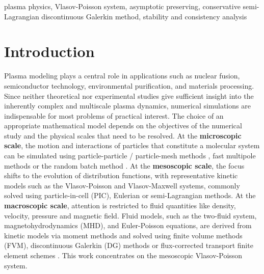 \documentclass[letterpaper,10pt]{article}
\numberwithin{equation}{section}
\numberwithin{figure}{section}
\numberwithin{table}{section}
\begin{document}
\begin{keywords}
plasma physics, Vlasov-Poisson system, asymptotic preserving, conservative semi-Lagrangian discontinuous Galerkin method, stability and consistency analysis 
\end{keywords}


\section{Introduction}

\hspace{4pt}
Plasma modeling plays a central role in applications such as nuclear fusion, semiconductor technology, environmental purification, and materials processing. Since neither theoretical nor experimental studies give sufficient insight into the inherently complex and multiscale plasma dynamics, numerical simulations are indispensable for most problems of practical interest.
The choice of an appropriate mathematical model depends on the objectives of the numerical study and the  physical scales that need to be resolved.
At the \textbf{microscopic scale}, the motion and interactions of
 particles that constitute a molecular system can be simulated using 
particle-particle / particle-mesh methods \cite{Luty01121994}, fast multipole methods \cite{GREENGARD1987325} or the random batch method  \cite{JIN2020108877}.
At the \textbf{mesoscopic scale}, the focus shifts to the evolution of distribution functions, with representative kinetic models such as the Vlasov-Poisson and Vlasov-Maxwell systems, commonly solved using particle-in-cell (PIC)\cite{Villasenor1992,LAPENTA2017349}, Eulerian\cite{Cheng2013,Cheng2014} or semi-Lagrangian methods\cite{QIU2011DG,Cai2018}. 
At the \textbf{macroscopic scale}, attention is restricted to fluid quantities like density, velocity, pressure and magnetic field. 
Fluid models, such as the two-fluid system, magnetohydrodynamics (MHD), and Euler-Poisson equations, are derived from kinetic models via moment methods and solved using finite volume methods (FVM)\cite{tang2010gas,stv2380}, discontinuous Galerkin (DG) methods \cite{CHENG2013255,li2005locally} or flux-corrected transport finite element schemes \cite{Kuzman2017}.
This work concentrates on the mesoscopic Vlasov-Poisson system.
\end{document}
